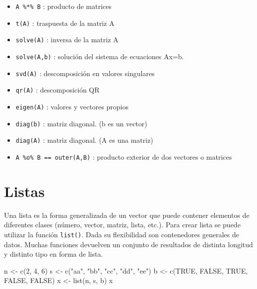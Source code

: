 \documentclass[
]{book}
\newenvironment{Shaded}{\begin{snugshade}}{\end{snugshade}}
\newcommand{\ConstantTok}[1]{\textcolor[rgb]{0.00,0.00,0.00}{#1}}
\newcommand{\DecValTok}[1]{\textcolor[rgb]{0.00,0.00,0.81}{#1}}
\newcommand{\FunctionTok}[1]{\textcolor[rgb]{0.00,0.00,0.00}{#1}}
\newcommand{\NormalTok}[1]{#1}
\newcommand{\OtherTok}[1]{\textcolor[rgb]{0.56,0.35,0.01}{#1}}
\newcommand{\StringTok}[1]{\textcolor[rgb]{0.31,0.60,0.02}{#1}}
\providecommand{\tightlist}{%
  \setlength{\itemsep}{0pt}\setlength{\parskip}{0pt}}
\begin{document}
\begin{itemize}
\tightlist
\item
  \texttt{A\ \%*\%\ B} : producto de matrices
\item
  \texttt{t(A)} : traspuesta de la matriz A
\item
  \texttt{solve(A)} : inversa de la matriz A
\item
  \texttt{solve(A,b)} : solución del sistema de ecuaciones Ax=b.
\item
  \texttt{svd(A)} : descomposición en valores singulares
\item
  \texttt{qr(A)} : descomposición QR
\item
  \texttt{eigen(A)} : valores y vectores propios
\item
  \texttt{diag(b)} : matriz diagonal. (b es un vector)
\item
  \texttt{diag(A)} : matriz diagonal. (A es una matriz)
\item
  \texttt{A\ \%o\%\ B\ ==\ outer(A,B)} : producto exterior de dos vectores o matrices
\end{itemize}

\hypertarget{listas}{%
\section{Listas}\label{listas}}

Una lista es la forma generalizada de un vector que puede contener elementos de diferentes clases (número, vector, matriz, lista, etc.). Para crear lista se puede utilizar la función \texttt{list()}. Dada su flexibilidad son contenedores generales de datos. Muchas funciones devuelven un conjunto de resultados de distinta longitud y distinto tipo en forma de lista.

\begin{Shaded}
\begin{Highlighting}[]
\NormalTok{n }\OtherTok{\textless{}{-}}  \FunctionTok{c}\NormalTok{(}\DecValTok{2}\NormalTok{, }\DecValTok{4}\NormalTok{, }\DecValTok{6}\NormalTok{)}
\NormalTok{s }\OtherTok{\textless{}{-}}  \FunctionTok{c}\NormalTok{(}\StringTok{"aa"}\NormalTok{, }\StringTok{"bb"}\NormalTok{, }\StringTok{"cc"}\NormalTok{, }\StringTok{"dd"}\NormalTok{, }\StringTok{"ee"}\NormalTok{)}
\NormalTok{b }\OtherTok{\textless{}{-}}  \FunctionTok{c}\NormalTok{(}\ConstantTok{TRUE}\NormalTok{, }\ConstantTok{FALSE}\NormalTok{, }\ConstantTok{TRUE}\NormalTok{, }\ConstantTok{FALSE}\NormalTok{, }\ConstantTok{FALSE}\NormalTok{)}
\NormalTok{x }\OtherTok{\textless{}{-}}  \FunctionTok{list}\NormalTok{(n, s, b)}
\NormalTok{x}
\end{Highlighting}
\end{Shaded}
\end{document}
